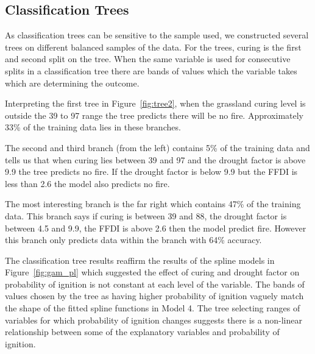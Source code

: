 \documentclass[11pt,a4paper]{article}
\begin{document}


\subsection{Classification Trees}

As classification trees can be sensitive to the sample used, we constructed several trees on different balanced samples of the data. 
For the trees, curing is the first and second split on the tree. When the same variable is used for consecutive splits in a classification tree there are bands of values which the variable takes which are determining the outcome.

Interpreting the first tree in Figure~\ref{fig:tree2}, when the grassland curing level is outside the 39 to 97 range the tree predicts there will be no fire. Approximately 33\% of the training data lies in these branches.

The second and third branch (from the left) contains 5\% of the training data and tells us that when curing lies between 39 and 97 and the drought factor is above 9.9 the tree predicts no fire. If the drought factor is below 9.9 but the FFDI is less than 2.6 the model also predicts no fire.

The most interesting branch is the far right which contains 47\% of the training data. This branch says if curing is between 39 and 88, the drought factor is between 4.5 and 9.9, the FFDI is above 2.6 then the model predict fire. However this branch only predicts data within the branch with 64\% accuracy.

The classification tree results reaffirm the results of the spline models in Figure~\ref{fig:gam_pl} which suggested the effect of curing and drought factor on probability of ignition is not constant at each level of the variable. The bands of values chosen by the tree as having higher probability of ignition vaguely match the shape of the fitted spline functions in Model 4. The tree selecting ranges of variables for which probability of ignition changes suggests there is a  non-linear relationship between some of the explanatory variables and probability of ignition.

\end{document}
